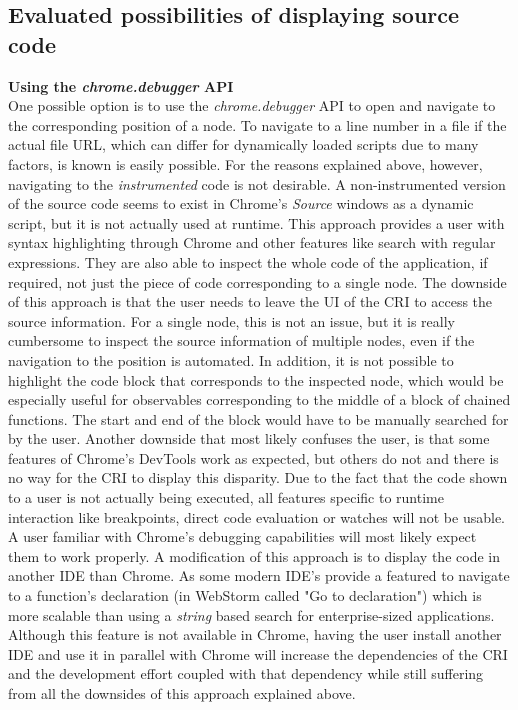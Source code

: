 \subsection{Evaluated possibilities of displaying source code}
\noindent\textbf{Using the \emph{chrome.debugger} API}\\
One possible option is to use the \emph{chrome.debugger} API to open and navigate to the corresponding position of a node. To navigate to a line number in a file if the actual file URL, which can differ for dynamically loaded scripts due to many factors, is known is easily possible. For the reasons explained above, however, navigating to the \emph{instrumented} code is not desirable. A non-instrumented version of the source code seems to exist in Chrome's \emph{Source} windows as a dynamic script, but it is not actually used at runtime. This approach provides a user with syntax highlighting through Chrome and other features like search with regular expressions. They are also able to inspect the whole code of the application, if required, not just the piece of code corresponding to a single node. The downside of this approach is that the user needs to leave the UI of the CRI to access the source information. For a single node, this is not an issue, but it is really cumbersome to inspect the source information of multiple nodes, even if the navigation to the position is automated. In addition, it is not possible to highlight the code block that corresponds to the inspected node, which would be especially useful for observables corresponding to the middle of a block of chained functions. The start and end of the block would have to be manually searched for by the user. Another downside that most likely confuses the user, is that some features of Chrome's DevTools work as expected, but others do not and there is no way for the CRI to display this disparity. Due to the fact that the code shown to a user is not actually being executed, all features specific to runtime interaction like breakpoints, direct code evaluation or watches will not be usable. A user familiar with Chrome's debugging capabilities will most likely expect them to work properly. A modification of this approach is to display the code in another IDE than Chrome. As some modern IDE's provide a featured to navigate to a function's declaration (in WebStorm called "Go to declaration") which is more scalable than using a \emph{string} based search for enterprise-sized applications. Although this feature is not available in Chrome, having the user install another IDE and use it in parallel with Chrome will increase the dependencies of the CRI and the development effort coupled with that dependency while still suffering from all the downsides of this approach explained above.\\

